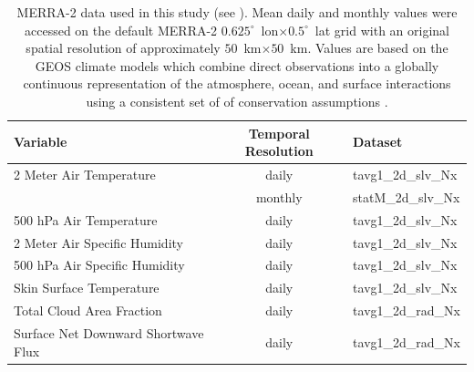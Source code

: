 \documentclass[11pt]{report}
\begin{document}
\begin{table}[!h]
\begin{center}
\begin{tabular}{ |l|c|l| } 
\hline
\bfseries{Variable} & \bfseries{Temporal Resolution} & \bfseries{Dataset}\\
\hline
2 Meter Air Temperature 			& daily 	&  tavg1\_2d\_slv\_Nx\\ 
									& monthly 	&  statM\_2d\_slv\_Nx\\
500 hPa Air Temperature 			& daily 	&  tavg1\_2d\_slv\_Nx\\ 
2 Meter Air Specific Humidity 		& daily 	& tavg1\_2d\_slv\_Nx \\ 
500 hPa Air Specific Humidity 		& daily 	& tavg1\_2d\_slv\_Nx \\ 
Skin Surface Temperature 			& daily 	& tavg1\_2d\_slv\_Nx \\ 
Total Cloud	Area Fraction			& daily 	& tavg1\_2d\_rad\_Nx \\
Surface Net Downward Shortwave Flux & daily 	& tavg1\_2d\_rad\_Nx \\
\hline
\end{tabular}
\caption[MERRA-2 Data]{MERRA-2 data used in this study (see ). Mean daily and monthly values were accessed on the default MERRA-2 $0.625^{\circ}$~lon$\times0.5^{\circ}$~lat grid with an original spatial resolution of approximately $50$~km$\times50$~km\cite[][]{bosilovich2016}. Values are based on the GEOS climate models which combine direct observations into a globally continuous representation of the atmosphere, ocean, and surface interactions using a consistent set of of conservation assumptions \cite[][]{gelaro2017,bosilovich2016}. \label{tab:merradata}}
\end{center}
\end{table}
\end{document}

